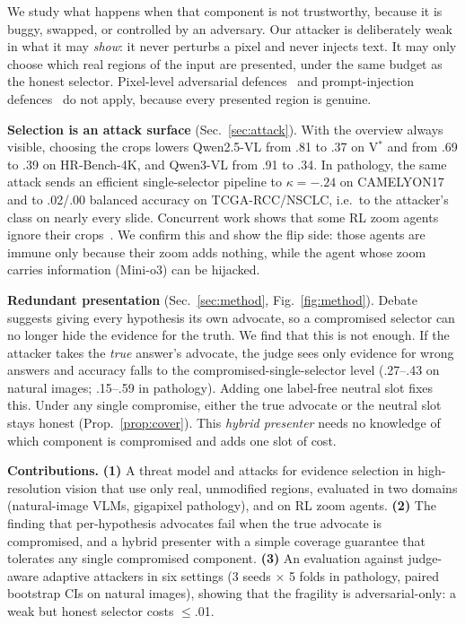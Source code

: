 \documentclass[10pt,twocolumn,letterpaper]{article}
\begin{document}
We study what happens when that component is not trustworthy, because it is buggy, swapped, or controlled by an adversary. Our attacker is deliberately weak in what it may \emph{show}: it never perturbs a pixel and never injects text. It may only choose which real regions of the input are presented, under the same budget as the honest selector. Pixel-level adversarial defences~\cite{foote2021now,mil_adv2022} and prompt-injection defences~\cite{wu2024agentattack,crossinject2025} do not apply, because every presented region is genuine.

\textbf{Selection is an attack surface} (Sec.~\ref{sec:attack}). With the overview always visible, choosing the crops lowers Qwen2.5-VL from .81 to .37 on V$^*$ and from .69 to .39 on HR-Bench-4K, and Qwen3-VL from .91 to .34. In pathology, the same attack sends an efficient single-selector pipeline to $\kappa=-.24$ on CAMELYON17 and to .02/.00 balanced accuracy on TCGA-RCC/NSCLC, i.e.\ to the attacker's class on nearly every slide. Concurrent work shows that some RL zoom agents ignore their crops~\cite{wang2026illusion,liu2025faithful}. We confirm this and show the flip side: those agents are immune only because their zoom adds nothing, while the agent whose zoom carries information (Mini-o3) can be hijacked.

\textbf{Redundant presentation} (Sec.~\ref{sec:method}, Fig.~\ref{fig:method}). Debate~\cite{irving2018debate,khan2024debate} suggests giving every hypothesis its own advocate, so a compromised selector can no longer hide the evidence for the truth. We find that this is not enough. If the attacker takes the \emph{true} answer's advocate, the judge sees only evidence for wrong answers and accuracy falls to the compromised-single-selector level (.27--.43 on natural images; .15--.59 in pathology). Adding one label-free neutral slot fixes this. Under any single compromise, either the true advocate or the neutral slot stays honest (Prop.~\ref{prop:cover}). This \emph{hybrid presenter} needs no knowledge of which component is compromised and adds one slot of cost.

\textbf{Contributions.}
\textbf{(1)} A threat model and attacks for evidence selection in high-resolution vision that use only real, unmodified regions, evaluated in two domains (natural-image VLMs, gigapixel pathology), and on RL zoom agents.
\textbf{(2)} The finding that per-hypothesis advocates fail when the true advocate is compromised, and a hybrid presenter with a simple coverage guarantee that tolerates any single compromised component.
\textbf{(3)} An evaluation against judge-aware adaptive attackers in six settings (3 seeds $\times$ 5 folds in pathology, paired bootstrap CIs on natural images), showing that the fragility is adversarial-only: a weak but honest selector costs $\le$.01.
\end{document}

